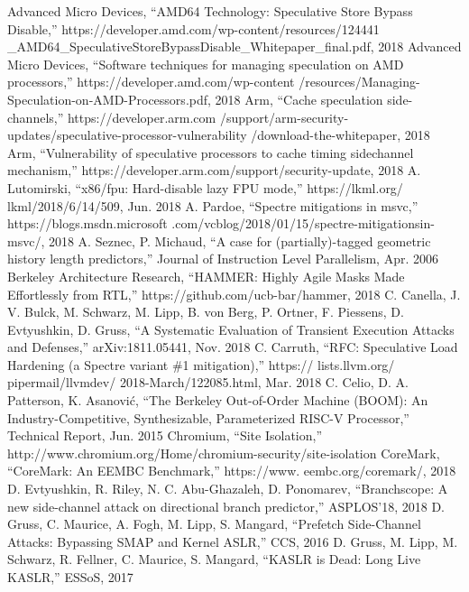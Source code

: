 \begin{thebibliography}{00}
     Advanced Micro Devices, ``AMD64 Technology: Speculative Store Bypass Disable,'' https://developer.amd.com/wp-content/resources/124441 \_AMD64\_SpeculativeStoreBypassDisable\_Whitepaper\_final.pdf, 2018
     Advanced Micro Devices, ``Software techniques for managing speculation on AMD processors,'' https://developer.amd.com/wp-content /resources/Managing-Speculation-on-AMD-Processors.pdf, 2018
     Arm, ``Cache speculation side-channels,'' https://developer.arm.com /support/arm-security-updates/speculative-processor-vulnerability /download-the-whitepaper, 2018
     Arm, ``Vulnerability of speculative processors to cache timing sidechannel mechanism,'' https://developer.arm.com/support/security-update, 2018
     A. Lutomirski, ``x86/fpu: Hard-disable lazy FPU mode,'' https://lkml.org/ lkml/2018/6/14/509, Jun. 2018
     A. Pardoe, ``Spectre mitigations in msvc,'' https://blogs.msdn.microsoft .com/vcblog/2018/01/15/spectre-mitigationsin-msvc/, 2018
     A. Seznec, P. Michaud, ``A case for (partially)-tagged geometric history length predictors,'' Journal of Instruction Level Parallelism, Apr. 2006
     Berkeley Architecture Research, ``HAMMER: Highly Agile Masks Made Effortlessly from RTL,'' https://github.com/ucb-bar/hammer, 2018
	 C. Canella, J. V. Bulck, M. Schwarz, M. Lipp, B. von Berg, P. Ortner, F. Piessens, D. Evtyushkin, D. Gruss, ``A Systematic Evaluation of Transient Execution Attacks and Defenses,'' arXiv:1811.05441, Nov. 2018
     C. Carruth, ``RFC: Speculative Load Hardening (a Spectre variant \#1 mitigation),'' https:// lists.llvm.org/ pipermail/llvmdev/ 2018-March/122085.html, Mar. 2018
     C. Celio, D. A. Patterson, K. Asanović, ``The Berkeley Out-of-Order Machine (BOOM): An Industry-Competitive, Synthesizable, Parameterized RISC-V Processor,'' Technical Report, Jun. 2015
     Chromium, ``Site Isolation,'' http://www.chromium.org/Home/chromium-security/site-isolation
     CoreMark, ``CoreMark: An EEMBC Benchmark,'' https://www. eembc.org/coremark/, 2018
     D. Evtyushkin, R. Riley, N. C. Abu-Ghazaleh, D. Ponomarev, ``Branchscope: A new side-channel attack on directional branch predictor,'' ASPLOS’18, 2018
     D. Gruss, C. Maurice, A. Fogh, M. Lipp, S. Mangard, ``Prefetch Side-Channel Attacks: Bypassing SMAP and Kernel ASLR,'' CCS, 2016
     D. Gruss, M. Lipp, M. Schwarz, R. Fellner, C. Maurice, S. Mangard, ``KASLR is Dead: Long Live KASLR,'' ESSoS, 2017

\end{thebibliography}
